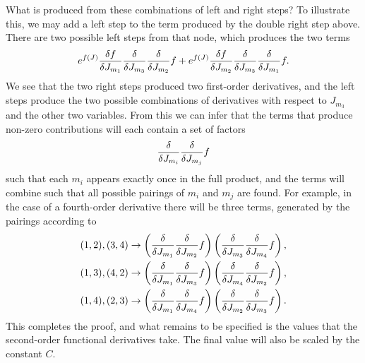 What is produced from these combinations of left and right steps? To illustrate this, we may add a left step to the term produced by the double right step above. There are two possible left steps from that node, which produces the two terms
\begin{align*}
	e^{f(J)}\fdv{f}{J_{m_{1}}}\fdv{J_{m_{3}}}\fdv{J_{m_{2}}}f + e^{f(J)}\fdv{f}{J_{m_{2}}}\fdv{J_{m_{3}}}\fdv{J_{m_{1}}}f.
\end{align*}
We see that the two right steps produced two first-order derivatives, and the left steps produce the two possible combinations of derivatives with respect to $J_{m_{3}}$ and the other two variables. From this we can infer that the terms that produce non-zero contributions will each contain a set of factors
\begin{align*}
	\fdv{J_{m_{i}}}\fdv{J_{m_{j}}}f
\end{align*}
such that each $m_{i}$ appears exactly once in the full product, and the terms will combine such that all possible pairings of $m_{i}$ and $m_{j}$ are found. For example, in the case of a fourth-order derivative there will be three terms, generated by the pairings according to
\begin{align*}
	&(1, 2), (3, 4) \to \left(\fdv{J_{m_{1}}}\fdv{J_{m_{2}}}f\right)\left(\fdv{J_{m_{3}}}\fdv{J_{m_{4}}}f\right), \\
	&(1, 3), (4, 2) \to \left(\fdv{J_{m_{1}}}\fdv{J_{m_{3}}}f\right)\left(\fdv{J_{m_{4}}}\fdv{J_{m_{2}}}f\right), \\
	&(1, 4), (2, 3) \to \left(\fdv{J_{m_{1}}}\fdv{J_{m_{4}}}f\right)\left(\fdv{J_{m_{2}}}\fdv{J_{m_{3}}}f\right).
\end{align*}
This completes the proof, and what remains to be specified is the values that the second-order functional derivatives take. The final value will also be scaled by the constant $C$.

